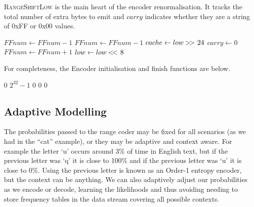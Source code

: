 \documentclass[a4paper]{article}
\begin{document}
\textsc{RangeShiftLow} is the main heart of the encoder renormalisation.
It tracks the total number of extra bytes to emit and $carry$ indicates whether they are a string of 0xFF or 0x00 values.

\begin{algorithmic}[1]
      \State {} 
        \State {}
        \State $FFnum \gets FFnum - 1$
      \EndWhile
    \Else
      \State {} 
        \State {}
        \State $FFnum \gets FFnum - 1$
      \EndWhile
    \EndIf
    \State $cache \gets low \mathbin{>\mkern-3mu>\,} 24$ 
    \State $carry \gets 0$
  \Else
    \State $FFnum \gets FFnum + 1$
  \EndIf
  \Statex
  \State $low \gets low \mathbin{<\mkern-3mu<\,} 8$
\EndProcedure
\end{algorithmic}

For completeness, the Encoder initialisation and finish functions are below.

\begin{algorithmic}[1]
  \settowidth{\maxwidth}{FFnum\ }
  \State {} $0$
  \State {} $2^{32}-1$
  \State {} $0$
  \State {} $0$
  \State {} $0$
\EndProcedure
\end{algorithmic}

\begin{algorithmic}[1]
   
    \State {}
  \EndFor
\EndProcedure
\end{algorithmic}


\subsection{Adaptive Modelling}

The probabilities passed to the range coder may be fixed for all scenarios (as we had in the ``cat'' example), or they may be adaptive and context aware.
For example the letter `u' occurs around 3\% of time in English text, but if the previous letter was `q' it is close to 100\% and if the previous letter was `u' it is close to 0\%.
Using the previous letter is known as an Order-1 entropy encoder, but the context can be anything.
We can also adaptively adjust our probabilities as we encode or
decode, learning the likelihoods and thus avoiding needing to store
frequency tables in the data stream covering all possible contexts.
\end{document}
